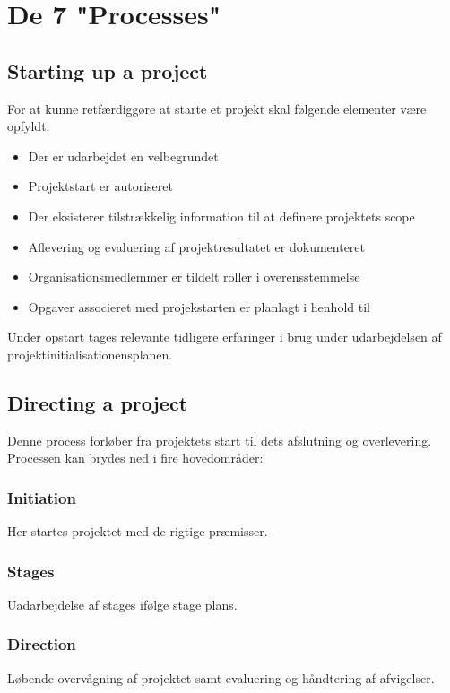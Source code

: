\chapter{De 7 "Processes"}

\section{Starting up a project}
For at kunne retfærdiggøre at starte et projekt skal følgende elementer være opfyldt:

\begin{itemize}
    \item Der er udarbejdet en velbegrundet 
    \item Projektstart er autoriseret
    \item Der eksisterer tilstrækkelig information til at definere projektets scope
    \item Aflevering og evaluering af projektresultatet er dokumenteret
    \item Organisationsmedlemmer er tildelt roller i overensstemmelse 
    \item Opgaver associeret med projekstarten er planlagt i henhold til 
\end{itemize}

Under opstart tages relevante tidligere erfaringer i brug under udarbejdelsen af projektinitialisationensplanen.

\section{Directing a project}
Denne process forløber fra projektets start til dets afslutning og overlevering. Processen kan brydes ned i fire hovedområder:

\subsection*{Initiation}
Her startes projektet med de rigtige præmisser.

\subsection*{Stages}
Uadarbejdelse af stages ifølge stage plans.

\subsection*{Direction}
Løbende overvågning af projektet samt evaluering og håndtering af afvigelser.

